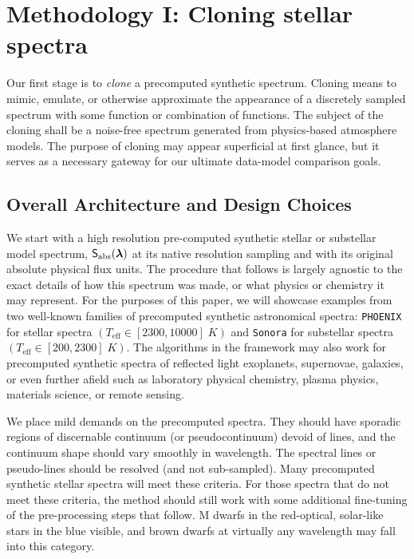 \documentclass[twocolumn]{aastex631}
\begin{document}
\section{Methodology I: Cloning stellar spectra}\label{methodology}

Our first stage is to \emph{clone} a precomputed synthetic spectrum.  Cloning means to mimic, emulate, or otherwise approximate the appearance of a discretely sampled spectrum with some function or combination of functions.  The subject of the cloning shall be a noise-free spectrum generated from physics-based atmosphere models.  The purpose of cloning may appear superficial at first glance, but it serves as a necessary gateway for our ultimate data-model comparison goals.

\subsection{Overall Architecture and Design Choices}

We start with a high resolution pre-computed synthetic stellar or substellar model spectrum, $\mathsf{S}_{\rm abs}(\bm{\lambda})$ at its native resolution sampling and with its original absolute physical flux units. The procedure that follows is largely agnostic to the exact details of how this spectrum was made, or what physics or chemistry it may represent. For the purposes of this paper, we will showcase examples from two well-known families of precomputed synthetic astronomical spectra: \texttt{PHOENIX} \citep{husser13} for stellar spectra $(T_{\mathrm{eff}}\in [2300, 10000]\;K)$ and \texttt{Sonora} \citep{2021ApJ...920...85M} for substellar spectra $(T_{\mathrm{eff}}\in [200, 2300]\;K)$. The algorithms in the framework may also work for precomputed synthetic spectra of reflected light exoplanets, supernovae, galaxies, or even further afield such as laboratory physical chemistry, plasma physics, materials science, or remote sensing.

We place mild demands on the precomputed spectra. They should have sporadic regions of discernable continuum (or pseudocontinuum) devoid of lines, and the continuum shape should vary smoothly in wavelength. The spectral lines or pseudo-lines should be resolved (and not sub-sampled). Many precomputed synthetic stellar spectra will meet these criteria. For those spectra that do not meet these criteria, the method should still work with some additional fine-tuning of the pre-processing steps that follow.  M dwarfs in the red-optical, solar-like stars in the blue visible, and brown dwarfs at virtually any wavelength may fall into this category.
\end{document}
